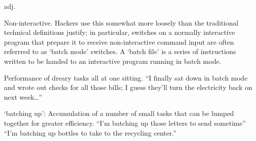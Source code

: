  adj.

\begin{inparaenum}
    \item Non-interactive. Hackers use this somewhat more loosely than the
        traditional technical definitions justify; in particular, switches on a
        normally interactive program that prepare it to receive non-interactive
        command input are often referrred to as `batch mode' switches. A `batch
        file' is a series of instructions written to be handed to an interactive
        program running in batch mode.
    \item Performance of dreary tasks all at one sitting. ``I finally sat down
        in batch mode and wrote out checks for all those bills; I guess they'll
        turn the electricity back on next week\ldots''
    \item `batching up': Accumulation of a number of small tasks that can be
        lumped together for greater efficiency. ``I'm batching up those letters
        to send sometime'' ``I'm batching up bottles to take to the recycling
        center.''
\end{inparaenum}

